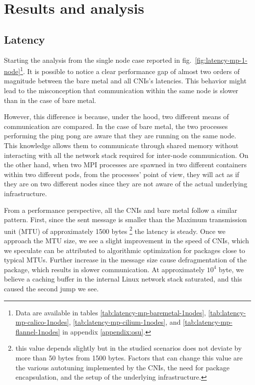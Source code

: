 \section{Results and analysis}
\label{sec:cniresuls}

\subsection{Latency}\label{subsec:results-latency}

Starting the analysis from the single node case reported in
fig.~\ref{fig:latency-mp-1-node}\footnote{
  Data are available in tables \ref{tab:latency-mp-baremetal-1nodes},
  \ref{tab:latency-mp-calico-1nodes}, \ref{tab:latency-mp-cilium-1nodes}, and
  \ref{tab:latency-mp-flannel-1nodes} in appendix \ref{appendix:osu}.}.
It is possible to notice a clear performance gap of almost two orders of
magnitude between the bare metal and all CNIs's latencies.
This behavior might lead to the misconception that communication within the same
node is slower than in the case of bare metal.

However, this difference is because, under the hood, two different means of
communication are compared.
In the case of bare metal, the two processes performing the ping pong
are aware that they are running on the same node.
This knowledge allows them to communicate through shared memory without
interacting with all the network stack required for inter-node communication.
On the other hand, when two MPI processes are spawned in two different
containers within two different pods, from the processes' point of view, they
will act as if they are on two different nodes since they are not aware of the
actual underlying infrastructure.

From a performance perspective, all the CNIs and bare metal follow a similar
pattern.
First, since the sent message is smaller than the Maximum transmission unit
(MTU) of approximately 1500 bytes \footnote{
  this value depends slightly but in the studied scenarios does not deviate by
  more than 50 bytes from 1500 bytes. Factors that can change this value are the
  various autotuning implemented by the CNIs, the need for package
  encapsulation, and the setup of the underlying infrastructure.
} the latency is steady.
Once we approach the MTU size, we see a slight improvement in the speed of CNIs,
which we speculate can be attributed to algorithmic optimization for packages
close to typical MTUs.
Further increase in the message size cause defragmentation of the package, which
results in slower communication.
At approximately $10^4$ byte, we believe a caching buffer in the internal Linux
network stack saturated, and this caused the second jump we see.

